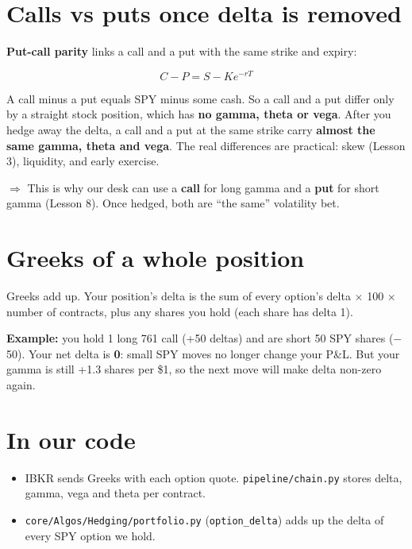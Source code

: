 \documentclass{article}
\begin{document}
\section{Calls vs puts once delta is removed}

\textbf{Put-call parity} links a call and a put with the same strike and expiry:

\[C - P = S - K e^{-rT}\]

A call minus a put equals SPY minus some cash. So a call and a put differ only by a straight stock position, which has \textbf{no gamma, theta or vega}. After you hedge away the delta, a call and a put at the same strike carry \textbf{almost the same gamma, theta and vega}. The real differences are practical: skew (Lesson 3), liquidity, and early exercise.

\textbf{$\Rightarrow$} This is why our desk can use a \textbf{call} for long gamma and a \textbf{put} for short gamma (Lesson 8). Once hedged, both are ``the same'' volatility bet.

\section{Greeks of a whole position}

Greeks add up. Your position's delta is the sum of every option's delta \ensuremath{\times} 100 \ensuremath{\times} number of contracts, plus any shares you hold (each share has delta 1).

\textbf{Example:} you hold 1 long 761 call (+50 deltas) and are short 50 SPY shares (\ensuremath{-}50). Your net delta is \textbf{0}: small SPY moves no longer change your P\&L. But your gamma is still +1.3 shares per \$1, so the next move will make delta non-zero again.

\section{In our code}

\begin{itemize}

\item IBKR sends Greeks with each option quote. \texttt{pipeline/\allowbreak{}chain.\allowbreak{}py} stores delta, gamma, vega and theta per contract.

\item \texttt{core/\allowbreak{}Algos/\allowbreak{}Hedging/\allowbreak{}portfolio.\allowbreak{}py} (\texttt{option\_\allowbreak{}delta}) adds up the delta of every SPY option we hold.

\end{itemize}
\end{document}
